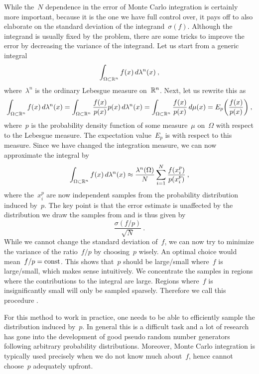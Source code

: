 While the~$N$ dependence in the error of Monte Carlo integration is certainly
more important, because it is the one we have full control over, it pays off to
also elaborate on the standard deviation of the integrand~$\sigma(f)$. Although
the integrand is usually fixed by the problem, there are some tricks to improve
the error by decreasing the variance of the integrand. Let us start from a
generic integral
%
\begin{equation}
  \int_{\Omega \subset \mathbb{R}^n} f(x) \,d\lambda^n(x)\:,
\end{equation}
%
where~$\lambda^n$ is the ordinary Lebesgue measure on~$\mathbb{R}^n$. Next, let us
rewrite this as
%
\begin{equation}
  \int_{\Omega \subset \mathbb{R}^n} f(x) \,d\lambda^n(x) =
    \int_{\Omega \subset \mathbb{R}^n} \frac{f(x)}{p(x)} p(x) \,d\lambda^n(x) =
    \int_{\Omega \subset \mathbb{R}^n} \frac{f(x)}{p(x)} \,d\mu(x) =
    E_{p}\biggl(\frac{f(x)}{p(x)}\biggr) \:,
\end{equation}
%
where~$p$ is the probability density function of some measure~$\mu$ on~$\Omega$
with respect to the Lebesgue measure. The expectation value~$E_p$ is with
respect to this measure. Since we have changed the integration measure, we can
now approximate the integral by
%
\begin{equation}
  \int_{\Omega \subset \mathbb{R}^n} f(x) \,d\lambda^n(x) \approx
  \frac{\lambda^n(\Omega)}{N} \sum_{i=1}^N \frac{f(x_i^p)}{p(x_i^p)}\:,
\end{equation}
%
where the~$x_i^p$ are now independent samples from the probability distribution
induced by~$p$. The key point is that the error estimate is unaffected by the
distribution we draw the samples from and is thus given by
%
\begin{equation}
  \frac{\sigma(f/p)}{\sqrt{N}} \:.
\end{equation}
%
While we cannot change the standard deviation of~$f$, we can now try to
minimize the variance of the ratio~$f/p$ by choosing~$p$ wisely. An optimal
choice would mean~$f/p = \mathrm{const}$. This shows that~$p$ should be large/small
where~$f$ is large/small, which makes sense intuitively. We concentrate the
samples in regions where the contributions to the integral are large. Regions
where~$f$ is insignificantly small will only be sampled sparsely. Therefore we
call this procedure .

For this method to work in practice, one needs to be able to efficiently sample
the distribution induced by~$p$. In general this is a difficult task and a lot
of research has gone into the development of good pseudo random number
generators following arbitrary probability distributions. Moreover, Monte Carlo
integration is typically used precisely when we do not know much about~$f$,
hence cannot choose~$p$ adequately upfront.

